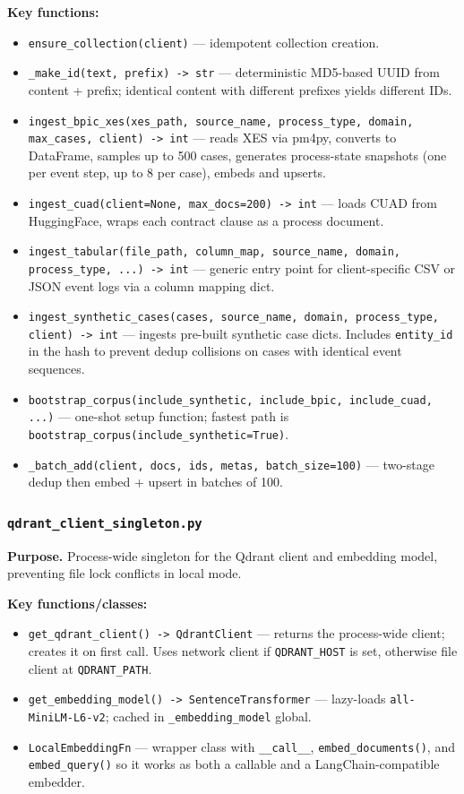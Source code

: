 \documentclass[12pt,a4paper]{article}
\begin{document}
\textbf{Key functions:}
\begin{itemize}[nosep]
  \item \texttt{ensure\_collection(client)} --- idempotent collection creation.
  \item \texttt{\_make\_id(text, prefix) -> str} --- deterministic MD5-based UUID
    from content + prefix; identical content with different prefixes yields different IDs.
  \item \texttt{ingest\_bpic\_xes(xes\_path, source\_name, process\_type, domain, max\_cases, client) -> int} ---
    reads XES via pm4py, converts to DataFrame, samples up to 500 cases, generates
    process-state snapshots (one per event step, up to 8 per case), embeds and upserts.
  \item \texttt{ingest\_cuad(client=None, max\_docs=200) -> int} --- loads CUAD from
    HuggingFace, wraps each contract clause as a process document.
  \item \texttt{ingest\_tabular(file\_path, column\_map, source\_name, domain, process\_type, ...) -> int} ---
    generic entry point for client-specific CSV or JSON event logs via a column mapping dict.
  \item \texttt{ingest\_synthetic\_cases(cases, source\_name, domain, process\_type, client) -> int} ---
    ingests pre-built synthetic case dicts. Includes \texttt{entity\_id} in the hash
    to prevent dedup collisions on cases with identical event sequences.
  \item \texttt{bootstrap\_corpus(include\_synthetic, include\_bpic, include\_cuad, ...)} ---
    one-shot setup function; fastest path is \texttt{bootstrap\_corpus(include\_synthetic=True)}.
  \item \texttt{\_batch\_add(client, docs, ids, metas, batch\_size=100)} --- two-stage
    dedup then embed + upsert in batches of 100.
\end{itemize}

\subsubsection{\texttt{qdrant\_client\_singleton.py}}

\textbf{Purpose.} Process-wide singleton for the Qdrant client and embedding model,
preventing file lock conflicts in local mode.

\textbf{Key functions/classes:}
\begin{itemize}[nosep]
  \item \texttt{get\_qdrant\_client() -> QdrantClient} --- returns the process-wide
    client; creates it on first call. Uses network client if \texttt{QDRANT\_HOST}
    is set, otherwise file client at \texttt{QDRANT\_PATH}.
  \item \texttt{get\_embedding\_model() -> SentenceTransformer} --- lazy-loads
    \texttt{all-MiniLM-L6-v2}; cached in \texttt{\_embedding\_model} global.
  \item \texttt{LocalEmbeddingFn} --- wrapper class with \texttt{\_\_call\_\_},
    \texttt{embed\_documents()}, and \texttt{embed\_query()} so it works as both
    a callable and a LangChain-compatible embedder.
\end{itemize}
\end{document}
